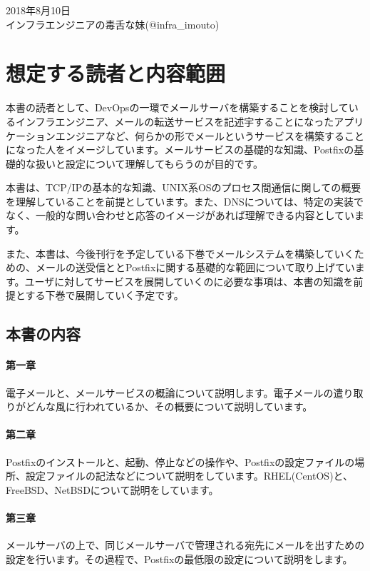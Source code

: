 \begin{flushright}
2018年8月10日 \\
インフラエンジニアの毒舌な妹(@infra\_imouto)
\end{flushright}

\section*{想定する読者と内容範囲}
本書の読者として、DevOpsの一環でメールサーバを構築することを検討しているインフラエンジニア、メールの転送サービスを記述宇することになったアプリケーションエンジニアなど、何らかの形でメールというサービスを構築することになった人をイメージしています。メールサービスの基礎的な知識、Postfixの基礎的な扱いと設定について理解してもらうのが目的です。

本書は、TCP/IPの基本的な知識、UNIX系OSのプロセス間通信に関しての概要を理解していることを前提としています。また、DNSについては、特定の実装でなく、一般的な問い合わせと応答のイメージがあれば理解できる内容としています。

また、本書は、今後刊行を予定している下巻でメールシステムを構築していくための、メールの送受信ととPostfixに関する基礎的な範囲について取り上げています。ユーザに対してサービスを展開していくのに必要な事項は、本書の知識を前提とする下巻で展開していく予定です。

\subsection*{本書の内容}

\paragraph{第一章}
電子メールと、メールサービスの概論について説明します。電子メールの遣り取りがどんな風に行われているか、その概要について説明しています。

\paragraph{第二章}
Postfixのインストールと、起動、停止などの操作や、Postfixの設定ファイルの場所、設定ファイルの記法などについて説明をしています。RHEL(CentOS)と、FreeBSD、NetBSDについて説明をしています。

\paragraph{第三章}
メールサーバの上で、同じメールサーバで管理される宛先にメールを出すための設定を行います。その過程で、Postfixの最低限の設定について説明をします。

